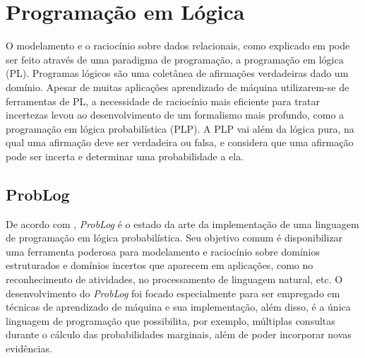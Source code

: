 \documentclass[
	12pt,				%
    oneside,			%
	a4paper,			%
	english,			%
	french,				%
	spanish,			%
	brazil,				%
	]{abntex2}
\begin{document}












\newpage
\section {Programação em Lógica}
 O modelamento e o raciocínio sobre dados relacionais, como explicado em  pode ser feito através de uma paradigma de programação, a programação em lógica (PL). Programas lógicos são uma coletânea de afirmações verdadeiras dado um domínio. Apesar de muitas aplicações aprendizado de máquina utilizarem-se de ferramentas de PL, a necessidade de raciocínio mais eficiente para tratar incertezas levou ao desenvolvimento de um formalismo mais profundo, como a programação em lógica probabilística (PLP). A PLP vai além da lógica pura, na qual uma afirmação deve ser verdadeira ou falsa, e considera que uma afirmação pode ser incerta e determinar uma probabilidade a ela.


\subsection{ProbLog}

De acordo com , \textit{ProbLog} é o estado da arte da implementação de uma linguagem de programação em lógica probabilística. Seu objetivo comum é disponibilizar uma ferramenta poderosa para modelamento e raciocínio sobre domínios estruturados e domínios incertos que aparecem em aplicações, como no reconhecimento de atividades, no processamento de linguagem natural, etc. O desenvolvimento do \textit{ProbLog} foi focado especialmente para ser empregado em técnicas de aprendizado de máquina e sua implementação, além disso, é a única linguagem de programação que possibilita, por exemplo, múltiplas consultas durante o cálculo das probabilidades marginais, além de poder incorporar novas evidências.
\end{document}
